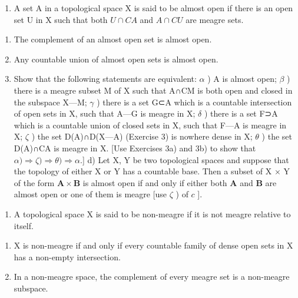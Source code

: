 \begin{enumerate}
\def\labelenumi{\arabic{enumi})}
\setcounter{enumi}{5}
\tightlist
\item
  A set A in a topological space X is said to be almost open if there is an open set U in X such that both \(U \cap C A\) and \(A \cap C U\) are meagre sets.
\end{enumerate}

\begin{enumerate}
\def\labelenumi{\alph{enumi})}
\item
  The complement of an almost open set is almost open.
\item
  Any countable union of almost open sets is almost open.
\item
  Show that the following statements are equivalent: \(\alpha\) ) A is almost open; \(\beta\) ) there is a meagre subset M of X such that A∩CM is both open and closed in the subspace X---M; \(\gamma\) ) there is a set G⊂A which is a countable intersection of open sets in X, such that A---G is meagre in X; \(\delta\) ) there is a set F⊃A which is a countable union of closed sets in X, such that F---A is meagre in X; \(\zeta\) ) the set D(A)∩D(X---A) (Exercise 3) is nowhere dense in X; \(\theta\) ) the set D(A)∩CA is meagre in X. {[}Use Exercises 3a) and 3b) to show that \(\alpha)\Longrightarrow\zeta)\Longrightarrow\theta)\Longrightarrow\alpha\).{]} d) Let X, Y be two topological spaces and suppose that the topology of either X or Y has a countable base. Then a subset of X × Y of the form \(\mathbf{A} \times \mathbf{B}\) is almost open if and only if either both \(\mathbf{A}\) and \(\mathbf{B}\) are almost open or one of them is meagre {[}use \(\zeta\) ) of \(c\) {]}.
\end{enumerate}

\begin{enumerate}
\def\labelenumi{\arabic{enumi})}
\setcounter{enumi}{6}
\tightlist
\item
  A topological space X is said to be non-meagre if it is not meagre relative to itself.
\end{enumerate}

\begin{enumerate}
\def\labelenumi{\alph{enumi})}
\item
  X is non-meagre if and only if every countable family of dense open sets in X has a non-empty intersection.
\item
  In a non-meagre space, the complement of every meagre set is a non-meagre subspace.
\end{enumerate}

